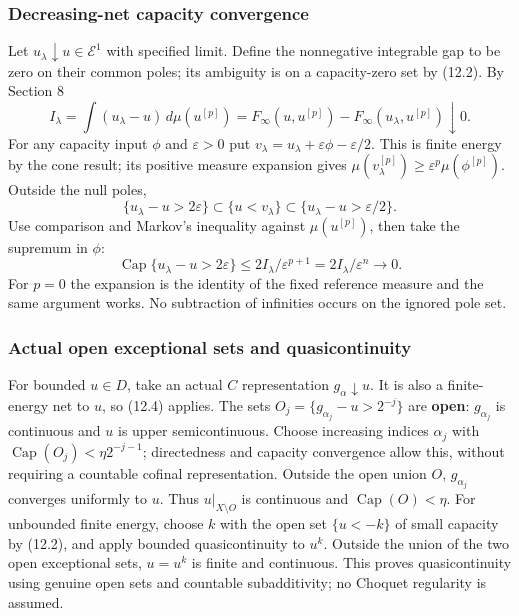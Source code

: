 \documentclass[
]{article}
\begin{document}
\subsubsection{Decreasing-net capacity
convergence}\label{decreasing-net-capacity-convergence}

Let \(u_\lambda\downarrow u\in\mathcal E^1\) with specified limit.
Define the nonnegative integrable gap to be zero on their common poles;
its ambiguity is on a capacity-zero set by (12.2). By Section 8
\[I_\lambda=\int(u_\lambda-u)\,d\mu(u^{[p]})
=F_\infty(u,u^{[p]})-F_\infty(u_\lambda,u^{[p]})\downarrow0.\] For any
capacity input \(\phi\) and \(\varepsilon>0\) put
\(v_\lambda=u_\lambda+\varepsilon\phi-\varepsilon/2\). This is finite
energy by the cone result; its positive measure expansion gives
\(\mu(v_\lambda^{[p]})\ge\varepsilon^p\mu(\phi^{[p]})\). Outside the
null poles,
\[\{u_\lambda-u>2\varepsilon\}\subset\{u<v_\lambda\}\subset\{u_\lambda-u>\varepsilon/2\}.\]
Use comparison and Markov's inequality against \(\mu(u^{[p]})\), then
take the supremum in \(\phi\):
\[\operatorname{Cap}\{u_\lambda-u>2\varepsilon\}\le2I_\lambda/\varepsilon^{p+1}=2I_\lambda/\varepsilon^n\longrightarrow0.\tag{12.4}\]
For \(p=0\) the expansion is the identity of the fixed reference measure
and the same argument works. No subtraction of infinities occurs on the
ignored pole set.

\subsubsection{Actual open exceptional sets and
quasicontinuity}\label{actual-open-exceptional-sets-and-quasicontinuity}

For bounded \(u\in D\), take an actual \(C\) representation
\(g_\alpha\downarrow u\). It is also a finite-energy net to \(u\), so
(12.4) applies. The sets \(O_j=\{g_{\alpha_j}-u>2^{-j}\}\) are
\textbf{open}: \(g_{\alpha_j}\) is continuous and \(u\) is upper
semicontinuous. Choose increasing indices \(\alpha_j\) with
\(\operatorname{Cap}(O_j)<\eta2^{-j-1}\); directedness and capacity
convergence allow this, without requiring a countable cofinal
representation. Outside the open union \(O\), \(g_{\alpha_j}\) converges
uniformly to \(u\). Thus \(u|_{X\setminus O}\) is continuous and
\(\operatorname{Cap}(O)<\eta\). For unbounded finite energy, choose
\(k\) with the open set \(\{u<-k\}\) of small capacity by (12.2), and
apply bounded quasicontinuity to \(u^k\). Outside the union of the two
open exceptional sets, \(u=u^k\) is finite and continuous. This proves
quasicontinuity using genuine open sets and countable subadditivity; no
Choquet regularity is assumed.
\end{document}
